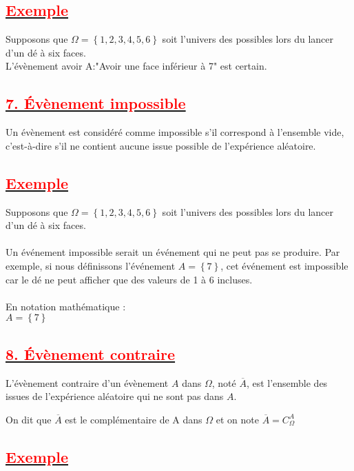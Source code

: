 \documentclass[12pt]{article}
\begin{document}
\subsection*{\underline{\textbf{\textcolor{red}{Exemple}}}}
Supposons que $\Omega = \left\lbrace 1, 2, 3, 4, 5, 6\right\rbrace $ soit l'univers des possibles lors du lancer d'un dé à six faces.\\
L'évènement avoir A:"Avoir une face inférieur à 7" est certain.
\subsection*{\underline{\textbf{\textcolor{red}{7. Évènement impossible}}}}
Un évènement est considéré comme impossible s'il correspond à l'ensemble vide, c'est-à-dire s'il ne contient aucune issue possible de l'expérience aléatoire.
\subsection*{\underline{\textbf{\textcolor{red}{Exemple}}}}
Supposons que $\Omega = \left\lbrace 1, 2, 3, 4, 5, 6 \right\rbrace  $ soit l'univers des possibles lors du lancer d'un dé à six faces.\\\\

Un événement impossible serait un événement qui ne peut pas se produire. Par exemple, si nous définissons l'événement $A = \left\lbrace 7 \right\rbrace $, cet événement est impossible car le dé ne peut afficher que des valeurs de 1 à 6 incluses.\\\\

En notation mathématique :\\
$A=\left\lbrace 7 \right\rbrace $
\subsection*{\underline{\textbf{\textcolor{red}{8. Évènement contraire}}}}

L'évènement contraire d'un évènement $A$ dans $\Omega$, noté $\overline{A}$, est l'ensemble des issues de l'expérience aléatoire qui ne sont pas dans $A$.

On dit que $\overline{A}$ est le complémentaire de A dans $\Omega$ et on note 
$\overline{A}=C^{A}_{\Omega}$
\subsection*{\underline{\textbf{\textcolor{red}{Exemple}}}}
\end{document}
